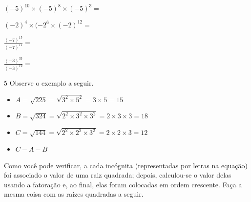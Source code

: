 \begin{escolha}[itemsep=0pt]

    \item ${( - 5)}^{10} \times ( - {5})^{8} \times {( - 5)}^{3} =$ 

    \item ${( - 2)}^{4} \times ( - {2}^{6} \times {( - 2)}^{12} =$ 

    \item $\frac{{( - 7)}^{15}}{{( - 7)}^{11}} =$ 

    \item $\frac{{( - 3)}^{33}}{{( - 3)}^{12}} =$ 


\end{escolha}

\num{5} Observe o exemplo a seguir. 

\begin{itemize}%
\item $A = \sqrt{225} = \sqrt{3^{2} \times 5^{2}} = 3 \times 5 = 15$
\item $B = \sqrt{324} = \sqrt{2^2 \times 3^2 \times 3^2} = 2 \times 3 \times 3 = 18$
\item $C = \sqrt{144} = \sqrt{2^2 \times 2^2 \times 3^2} = 2 \times 2 \times 3 = 12$
\item $C - A - B$
\end{itemize}

\noindent Como você pode verificar, a cada incógnita (representadas por letras na equação) foi associado o valor de uma raiz quadrada; depois, calculou-se
o valor delas usando a fatoração e, ao final, elas foram colocadas em ordem crescente. Faça a mesma
coisa com as raízes quadradas a seguir. 

